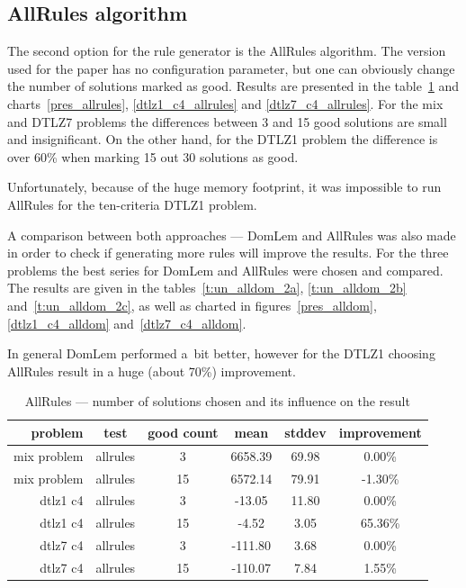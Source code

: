 \clearpage{}
\subsection{AllRules algorithm}

The second option for the rule generator is the AllRules algorithm. The
version used for the paper has no configuration parameter, but one can
obviously change the number of solutions marked as good. Results are presented
in the table~\ref{t:un_allrules_1} and charts~\ref{pres_allrules},
\ref{dtlz1_c4_allrules} and \ref{dtlz7_c4_allrules}. For the mix and DTLZ7
problems the differences between 3 and 15 good solutions are small and
insignificant. On the other hand, for the DTLZ1 problem the difference is over
60\% when marking 15 out 30 solutions as good.

Unfortunately, because of the huge memory footprint, it was impossible to run
AllRules for the ten-criteria DTLZ1 problem.

A comparison between both approaches --- DomLem and AllRules was also made in
order to check if generating more rules will improve the results. For the
three problems the best series for DomLem and AllRules were chosen and
compared. The results are given in the tables~\ref{t:un_alldom_2a},
\ref{t:un_alldom_2b} and~\ref{t:un_alldom_2c}, as well as charted in
figures~\ref{pres_alldom}, \ref{dtlz1_c4_alldom} and~\ref{dtlz7_c4_alldom}.

In general DomLem performed a~bit better, however for the DTLZ1 choosing
AllRules result in a huge (about 70\%) improvement.

\begin{table}[htb]
  \centering
  \begin{tabular}{r c c c c c}
    \hline
    problem & test & good count & mean & stddev & improvement \\
    \hline
    \hline
mix problem & allrules & 3 & 6658.39 & 69.98 & 0.00\% \\
mix problem & allrules & 15& 6572.14 & 79.91 & -1.30\% \\
    \hline
dtlz1 c4 & allrules & 3 &  -13.05 & 11.80 & 0.00\% \\
dtlz1 c4 & allrules & 15 &   -4.52 & 3.05 & 65.36\% \\
    \hline
dtlz7 c4 & allrules & 3 &-111.80 & 3.68 & 0.00\% \\
dtlz7 c4 & allrules &15 & -110.07 & 7.84 & 1.55\% \\
\hline
  \end{tabular}
  \caption{AllRules --- number of solutions chosen and its influence on the result}
  \label{t:un_allrules_1}
\end{table}


